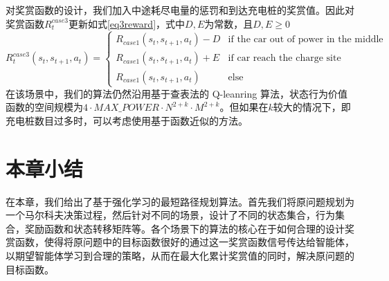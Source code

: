 \documentclass{standalone}
\begin{document}
对奖赏函数的设计，我们加入中途耗尽电量的惩罚和到达充电桩的奖赏值。因此对奖赏函数$R_t^{case3}$更新如式\ref{eq3reward}，式中$D, E$为常数，且$D, E \geq 0$
    \begin{equation}
    \label{eq3reward}
    R_t^{case3}(s_t, s_{t+1}, a_t) = \begin{cases}
     R_{case1}(s_t, s_{t+1}, a_t) - D &\mbox{if the car out of power in the middle}\\
     R_{case1}(s_t, s_{t+1}, a_t) + E&\mbox{if car reach the charge site}\\
     R_{case1}(s_t, s_{t+1}, a_t)&\mbox{else}
    \end{cases}
    \end{equation}
在该场景中，我们的算法仍然沿用基于查表法的 Q-leanring 算法，状态行为价值函数的空间规模为$4\cdot MAX\_POWER\cdot N^{2+k} \cdot M^{2+k}$。但如果在$k$较大的情况下，即充电桩数目过多时，可以考虑使用基于函数近似的方法。
\section{本章小结}
在本章，我们给出了基于强化学习的最短路径规划算法。首先我们将原问题规划为一个马尔科夫决策过程，然后针对不同的场景，设计了不同的状态集合，行为集合，奖励函数和状态转移矩阵等。各个场景下的算法的核心在于如何合理的设计奖赏函数，使得将原问题中的目标函数很好的通过这一奖赏函数信号传达给智能体，以期望智能体学习到合理的策略，从而在最大化累计奖赏值的同时，解决原问题的目标函数。
\end{document}
